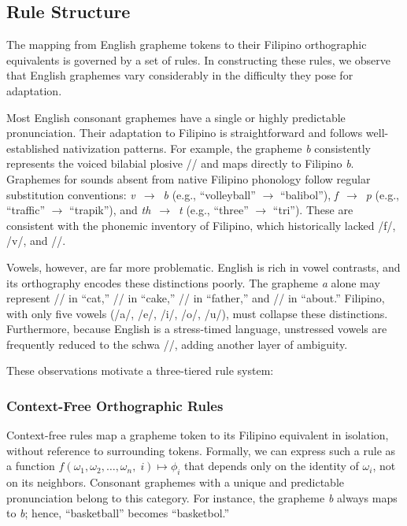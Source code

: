 \subsection{Rule Structure}

The mapping from English grapheme tokens to their Filipino orthographic
equivalents is governed by a set of rules. In constructing these rules, we
observe that English graphemes vary considerably in the difficulty they pose
for adaptation.

Most English consonant graphemes have a single or highly predictable
pronunciation. Their adaptation to Filipino is straightforward and follows
well-established nativization patterns. For example, the grapheme \emph{b}
consistently represents the voiced bilabial plosive // and maps
directly to Filipino \emph{b}. Graphemes for sounds absent from native Filipino
phonology follow regular substitution conventions: \emph{v}~$\rightarrow$~\emph{b}
(e.g., ``volleyball'' $\rightarrow$ ``balibol''), \emph{f}~$\rightarrow$~\emph{p}
(e.g., ``traffic'' $\rightarrow$ ``trapik''), and
\emph{th}~$\rightarrow$~\emph{t} (e.g., ``three'' $\rightarrow$ ``tri'').
These are consistent with the phonemic inventory of Filipino, which historically
lacked /f/, /v/, and //.

Vowels, however, are far more problematic. English is rich in vowel contrasts,
and its orthography encodes these distinctions poorly. The grapheme \emph{a}
alone may represent /\textipa{\ae}/ in ``cat,'' // in ``cake,''
// in ``father,'' and // in ``about.'' Filipino, with
only five vowels (/a/, /e/, /i/, /o/, /u/), must collapse these
distinctions. Furthermore, because English is a stress-timed language, unstressed
vowels are frequently reduced to the schwa //, adding another layer
of ambiguity.

These observations motivate a three-tiered rule system:

\subsubsection{Context-Free Orthographic Rules}

Context-free rules map a grapheme token to its Filipino equivalent in
isolation, without reference to surrounding tokens. Formally, we can express
such a rule as a function
$f(\omega_1, \omega_2, \dots, \omega_n,\; i) \mapsto \phi_i$
that depends only on the identity of $\omega_i$, not on its neighbors.
Consonant graphemes with a unique and predictable pronunciation belong to this
category. For instance, the grapheme \emph{b} always maps to \emph{b};
hence, ``basketball'' becomes ``basketbol.''

